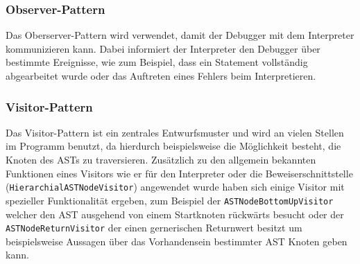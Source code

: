 \subsubsection{Observer-Pattern}
Das Oberserver-Pattern wird verwendet, damit der Debugger mit dem Interpreter kommunizieren kann. Dabei informiert der Interpreter den Debugger über bestimmte Ereignisse, wie zum Beispiel, dass ein Statement vollständig abgearbeitet wurde oder das Auftreten eines Fehlers beim Interpretieren. 

\subsubsection{Visitor-Pattern}
Das Visitor-Pattern ist ein zentrales Entwurfsmuster und wird an vielen Stellen im Programm benutzt, da hierdurch beispielsweise die Möglichkeit besteht, die Knoten des ASTs zu traversieren. Zusätzlich zu den allgemein bekannten Funktionen eines Visitors wie er für den Interpreter oder die Beweiserschnittstelle \\(\texttt{HierarchialASTNodeVisitor}) angewendet wurde haben sich einige Visitor mit spezieller Funktionalität ergeben, zum Beispiel der \texttt{ASTNodeBottomUpVisitor} welcher den AST ausgehend von einem Startknoten rückwärts besucht oder der \\ \texttt{ASTNodeReturnVisitor} der einen gernerischen Returnwert besitzt um beispielsweise Aussagen über das Vorhandensein bestimmter AST Knoten geben kann.
